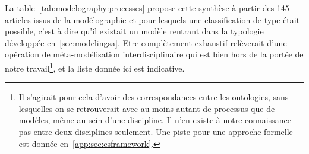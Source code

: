 


La table~\ref{tab:modelography:processes} propose cette synthèse à partir des 145 articles issus de la modélographie et pour lesquels une classification de type était possible, c'est à dire qu'il existait un modèle rentrant dans la typologie développée en~\ref{sec:modelingsa}. Etre complètement exhaustif relèverait d'une opération de méta-modélisation interdisciplinaire qui est bien hors de la portée de notre travail\footnote{Il s'agirait pour cela d'avoir des correspondances entre les ontologies, sans lesquelles on se retrouverait avec au moins autant de processus que de modèles, même au sein d'une discipline. Il n'en existe à notre connaissance pas entre deux disciplines seulement. Une piste pour une approche formelle est donnée en~\ref{app:sec:csframework}.}, et la liste donnée ici est indicative.


